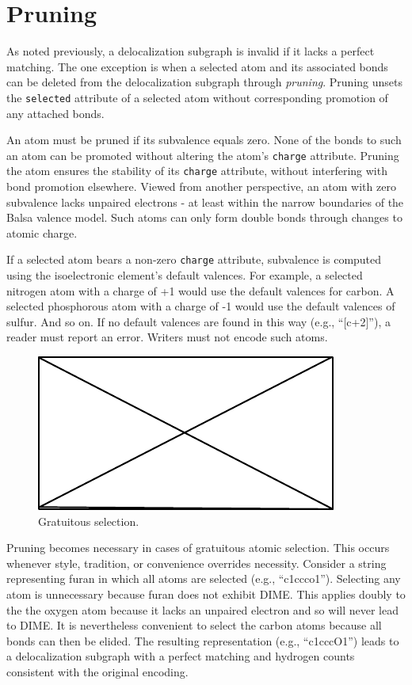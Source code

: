 \documentclass{article}
\def\ttt{\texttt}
\begin{document}
\section*{Pruning}

As noted previously, a delocalization subgraph is invalid if it lacks a perfect matching. The one exception is when a selected atom and its associated bonds can be deleted from the delocalization subgraph through \textit{pruning}. Pruning unsets the \ttt{selected} attribute of a selected atom without corresponding promotion of any attached bonds.

An atom must be pruned if its subvalence equals zero. None of the bonds to such an atom can be promoted without altering the atom's \ttt{charge} attribute. Pruning the atom ensures the stability of its \ttt{charge} attribute, without interfering with bond promotion elsewhere. Viewed from another perspective, an atom with zero subvalence lacks unpaired electrons - at least within the narrow boundaries of the Balsa valence model. Such atoms can only form double bonds through changes to atomic charge. 

If a selected atom bears a non-zero \ttt{charge} attribute, subvalence is computed using the isoelectronic element's default valences. For example, a selected nitrogen atom with a charge of +1 would use the default valences for carbon. A selected phosphorous atom with a charge of -1 would use the default valences of sulfur. And so on. If no default valences are found in this way (e.g., \enquote{[c+2]}), a reader must report an error. Writers must not encode such atoms.

\begin{figure}
    \centering
    \includegraphics{filler}
    \caption{Gratuitous selection.}
    \label{fig:gratuitous-selection}
\end{figure}

Pruning becomes necessary in cases of gratuitous atomic selection. This occurs whenever style, tradition, or convenience overrides necessity. Consider a string representing furan in which all atoms are selected (e.g., \enquote{c1ccco1}). Selecting any atom is unnecessary because furan does not exhibit DIME. This applies doubly to the the oxygen atom because it lacks an unpaired electron and so will never lead to DIME. It is nevertheless convenient to select the carbon atoms because all bonds can then be elided. The resulting representation (e.g., \enquote{c1cccO1}) leads to a delocalization subgraph with a perfect matching and hydrogen counts consistent with the original encoding.
\end{document}
